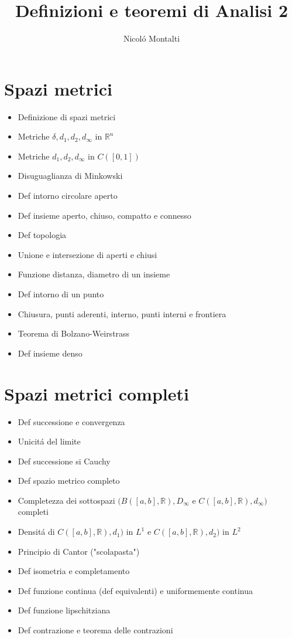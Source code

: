 \documentclass[10pt,a4paper, twocolumn]{article}
\title{Definizioni e teoremi di Analisi 2}
\author{Nicol\'o Montalti}
\date{}
\newcommand{\R}{\mathbb{R}}
\renewcommand{\,}{\text{, }}
\begin{document}
\maketitle

\section{Spazi metrici}
\begin{itemize}
    \item Definizione di spazi metrici
    \item Metriche $\delta, d_1, d_2, d_{\infty}$ in $\R^n$
    \item Metriche $d_1, d_2, d_{\infty}$ in $C([0,1])$
    \item Disuguaglianza di Minkowski
    \item Def intorno circolare aperto
    \item Def insieme aperto, chiuso, compatto e connesso
    \item Def topologia
    \item Unione e intersezione di aperti e chiusi
    \item Funzione distanza, diametro di un insieme
    \item Def intorno di un punto
    \item Chiusura, punti aderenti, interno, punti interni e frontiera
    \item Teorema di Bolzano-Weirstrass
    \item Def insieme denso
\end{itemize}

\section{Spazi metrici completi}
\begin{itemize}
    \item Def successione e convergenza
    \item Unicit\'a del limite
    \item Def successione si Cauchy
    \item Def spazio metrico completo
    \item Completezza dei sottospazi $(B([a,b],\R), D_{\infty}$ e $C([a,b],\R), d_{\infty})$ completi
    \item Densit\'a di $C([a,b],\R), d_1)$ in $L^1$ e $C([a,b],\R), d_2)$ in $L^2$
    \item Principio di Cantor ("scolapasta")
    \item Def isometria e completamento 
    \item Def funzione continua (def equivalenti) e uniformemente continua
    \item Def funzione lipschitziana
    \item Def contrazione e teorema delle contrazioni
\end{itemize}
\end{document}
